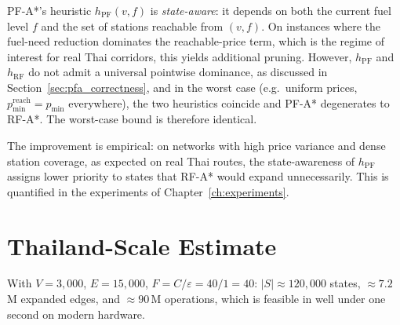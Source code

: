 PF-A*'s heuristic $h_{\mathrm{PF}}(v,f)$ is \emph{state-aware}: it depends on both the
current fuel level $f$ and the set of stations reachable from $(v,f)$.
On instances where the fuel-need reduction dominates the reachable-price term, which is the
regime of interest for real Thai corridors, this yields additional pruning.
However, $h_{\mathrm{PF}}$ and $h_{\mathrm{RF}}$ do not admit a universal pointwise
dominance, as discussed in Section~\ref{sec:pfa_correctness}, and in the worst case
(e.g.\ uniform prices, $p_{\min}^{\mathrm{reach}} = p_{\min}$ everywhere), the two
heuristics coincide and PF-A* degenerates to RF-A*.
The worst-case bound is therefore identical.

The improvement is empirical: on networks with high price variance and dense station
coverage, as expected on real Thai routes, the state-awareness of $h_{\mathrm{PF}}$
assigns lower priority to states that RF-A* would expand unnecessarily.
This is quantified in the experiments of Chapter~\ref{ch:experiments}.

\section{Thailand-Scale Estimate}

With $V = 3{,}000$, $E = 15{,}000$, $F = C/\varepsilon = 40/1 = 40$:
$|S| \approx 120{,}000$ states, $\approx 7.2$\,M expanded edges, and $\approx 90$\,M operations, which is feasible
in well under one second on modern hardware.
